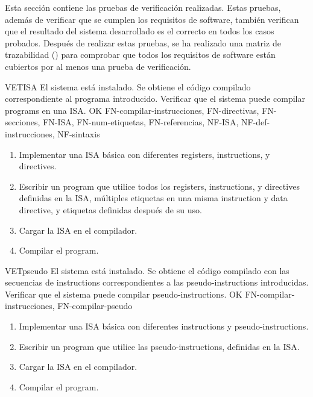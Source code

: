 Esta sección contiene las pruebas de verificación realizadas. Estas pruebas,
además de verificar que se cumplen los requisitos de software, también verifican
que el resultado del sistema desarrollado es el correcto en todos los casos
probados. Después de realizar estas pruebas, se ha realizado una matriz de
trazabilidad () para comprobar que todos los
requisitos de software están cubiertos por al menos una prueba de verificación.

\begin{testCase}{VET}{ISA}
    {El sistema está instalado.} %
    {Se obtiene el código compilado correspondiente al programa introducido.} %
    {Verificar que el sistema puede compilar \glspl{program} en una \gls{ISA}.} %
    {OK} %
    {FN-compilar-instrucciones, FN-directivas, FN-secciones, FN-ISA,
    FN-num-etiquetas, FN-referencias, NF-ISA, NF-def-instrucciones, NF-sintaxis} %
    \begin{enumerate}[leftmargin=*, topsep=0pt, noitemsep] %
        \item Implementar una \gls{ISA} básica con diferentes \glspl{register},
        \glspl{instruction}, y \glspl{directive}.
        \item Escribir un \gls{program} que utilice todos los \glspl{register},
        \glspl{instruction}, y \glspl{directive} definidas en la \gls{ISA},
        múltiples etiquetas en una misma \gls{instruction} y \gls{data directive},
        y etiquetas definidas después de su uso.
        \item Cargar la \gls{ISA} en el compilador.
        \item Compilar el \gls{program}.
    \end{enumerate}
\end{testCase}

\begin{testCase}{VET}{pseudo}
    {El sistema está instalado.} %
    {Se obtiene el código compilado con las secuencias de  \glspl{instruction}
    correspondientes a las \glspl{pseudo-instruction} introducidas.} %
    {Verificar que el sistema puede compilar \glspl{pseudo-instruction}.} %
    {OK} %
    {FN-compilar-instrucciones, FN-compilar-pseudo} %
    \begin{enumerate}[leftmargin=*, topsep=0pt, noitemsep] %
        \item Implementar una \gls{ISA} básica con diferentes
        \glspl{instruction} y \glspl{pseudo-instruction}.
        \item Escribir un \gls{program} que utilice las \glspl{pseudo-instruction},
        definidas en la \gls{ISA}.
        \item Cargar la \gls{ISA} en el compilador.
        \item Compilar el \gls{program}.
    \end{enumerate}
\end{testCase}

